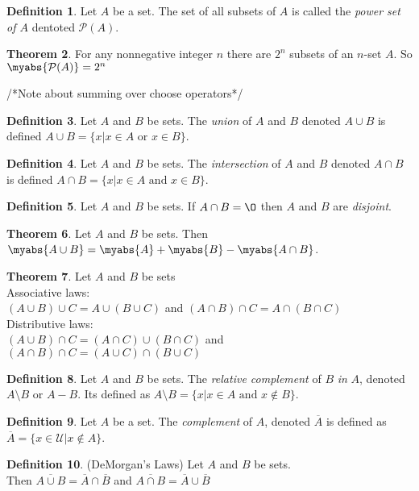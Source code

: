 \documentclass[11pt]{article}
\theoremstyle{definition}
\newtheorem{theorem}{Theorem}[section]
\newtheorem{definition}[theorem]{Definition}
\begin{document}
\begin{definition}
    Let $A$ be a set. The set of all subsets of $A$ is called the \emph{power set of $A$} dentoted $\mathcal{P}(A)$.
\end{definition}
\begin{theorem}
    For any nonnegative integer $n$ there are $2^n$ subsets of an $n$-set $A$. So $\myabs{\mathcal{P}(A)} = 2^n$
    \label{thm:power_combos}
\end{theorem}
/*Note about summing over choose operators*/
\begin{definition}
    Let $A$ and $B$ be sets. The \emph{union} of $A$ and $B$ denoted $A \cup B$ is defined $A \cup B = \{ x \vert x \in A \text{ or } x \in B \}$.
\end{definition}
\begin{definition}
    Let $A$ and $B$ be sets. The \emph{intersection} of $A$ and $B$ denoted $A \cap B$ is defined $A \cap B = \{ x \vert x \in A \text{ and } x \in B \}$.
\end{definition}
\begin{definition}
    Let $A$ and $B$ be sets. If $A \cap B = \O$ then $A$ and $B$ are \emph{disjoint}.
\end{definition}
\begin{theorem}
    Let $A$ and $B$ be sets. Then $\myabs{A \cup B} = \myabs{A} + \myabs{B} - \myabs{A \cap B}$.
\end{theorem}
\begin{theorem} 
    Let $A$ and $B$ be sets \\ Associative laws:\\
    $(A \cup B) \cup C = A \cup (B \cup C)$ and 
    $(A \cap B) \cap C = A \cap (B \cap C)$ \\
    Distributive laws:\\
    $(A \cup B) \cap C = (A \cap C) \cup (B \cap C)$ and
    $(A \cap B) \cap C = (A \cup C) \cap (B \cup C)$
\end{theorem}
\begin{definition}
    Let $A$ and $B$ be sets. The \emph{relative complement} of $B$ \emph{in} $A$, denoted $A \setminus B$ or $A - B$. Its defined as $A \setminus B = \{ x \vert x \in A \text{ and } x \notin B \}$.
\end{definition}
\begin{definition}
    Let $A$ be a set. The \emph{complement} of $A$, denoted $\overline{A}$ is defined as $\overline{A} = \{ x \in \mathcal{U} \vert x \notin A \}$.
\end{definition}
\begin{definition} (DeMorgan's Laws) Let $A$ and $B$ be sets. \\
    Then $\overline{A \cup B} = \overline{A} \cap \overline{B}$ and $\overline{A \cap B} = \overline{A} \cup \overline{B}$
\end{definition}
\end{document}
